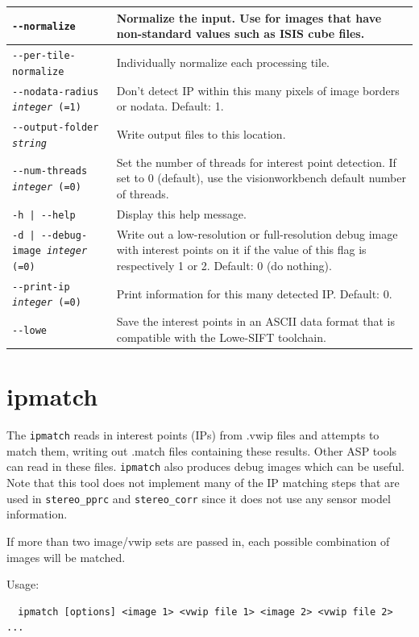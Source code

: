 \begin{longtable}{|l|p{9.5cm}|}
\texttt{-\/-normalize  } & Normalize the input. Use for images that have non-standard values such as ISIS cube files.\\ \hline
\texttt{-\/-per-tile-normalize  } & Individually normalize each processing tile.\\ \hline
\texttt{-\/-nodata-radius \textit{integer} (=1) } & Don't detect IP within this many pixels of image borders or nodata. Default: 1.\\ \hline
\texttt{-\/-output-folder \textit{string} } & Write output files to this location.\\ \hline
\texttt{-\/-num-threads \textit{integer} (=0) } & Set the number of threads for interest point detection. If set to 0 (default), use the visionworkbench default number of threads.\\ \hline
\texttt{-h | -\/-help   } & Display this help message.\\ \hline
\texttt{-d | -\/-debug-image  \textit{integer} (=0) } & Write out a low-resolution or full-resolution debug image with interest points on it if the value of this flag is respectively 1 or 2. Default: 0 (do nothing).\\ \hline
\texttt{-\/-print-ip \textit{integer} (=0) } & Print information for this many detected IP. Default: 0.\\ \hline
\texttt{-\/-lowe  } & Save the interest points in an ASCII data format that is compatible with the Lowe-SIFT toolchain.\\ \hline
\end{longtable}

\clearpage


\section{ipmatch}
\label{ipmatch}

The \texttt{ipmatch} reads in interest points (IPs) from .vwip files and attempts to match them,
writing out .match files containing these results.  Other ASP tools can read in these files.
\texttt{ipmatch} also produces debug images which can be useful.  Note that this tool does not
implement many of the IP matching steps that are used in \texttt{stereo\_pprc} and \texttt{stereo\_corr}
since it does not use any sensor model information.

If more than two image/vwip sets are passed in, each possible combination of images will be matched.

Usage:
\begin{verbatim}
  ipmatch [options] <image 1> <vwip file 1> <image 2> <vwip file 2> ...
\end{verbatim}

